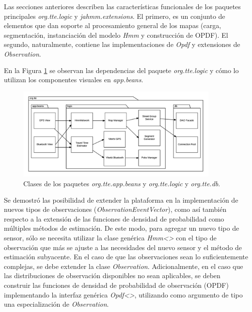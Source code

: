 Las secciones anteriores describen las características funcionales de los paquetes principales \textit{org.tte.logic} y \textit{jahmm.extensions}. El primero, es un conjunto de elementos que dan soporte al procesamiento general de los mapas (carga, segmentación, instanciación del modelo \textit{Hmm} y construcción de OPDF). El segundo, naturalmente, contiene las implementaciones de \textit{Opdf} y extensiones de \textit{Observation}. 

En la Figura \ref{fig:modulos-logic} se observan las dependencias del paquete \textit{org.tte.logic} y cómo lo utilizan los componentes visuales en \textit{app.beans}. 

\begin{figure}[!htp]
	\centering
	\includegraphics[width=0.9\textwidth]{images/modulos-logic.png}
	\captionsetup{width=0.9\textwidth}
	\caption{Clases de los paquetes \textit{org.tte.app.beans} y \textit{org.tte.logic} y \textit{org.tte.db}.}
    \label{fig:modulos-logic}
\end{figure}

Se demostró las posibilidad de extender la plataforma en la implementación de nuevos tipos de observaciones (\textit{ObservationEventVector}), como así también respecto a la extensión de las funciones de densidad de probabilidad como múltiples métodos de estimación. De este modo, para agregar un nuevo tipo de sensor, sólo se necesita utilizar la clase genérica \textit{Hmm<>} con el tipo de observación que más se ajuste a las necesidades del nuevo sensor y el método de estimación subyacente. En el caso de que las observaciones sean lo suficientemente complejas, se debe extender la clase \textit{Observation}. Adicionalmente, en el caso que las distribuciones de observación disponibles no sean aplicables, se deben construir las funciones de densidad de probabilidad de observación (OPDF) implementando la interfaz genérica \textit{Opdf<>}, utilizando como argumento de tipo una especialización de \textit{Observation}.


